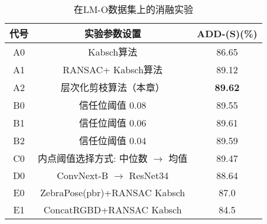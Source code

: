 \begin{table}[htbp]
  \centering
  \caption{在LM-O数据集上的消融实验}
  \label{tab:hipose_ablation_study}
  \begin{tabular}{@{}c|c|c@{}}
    \toprule
    代号 & 实验参数设置 & ADD-(S)(\%) \\
     \midrule
     A0 &Kabsch算法& 86.65 \\
     A1 &RANSAC+ Kabsch算法& 89.12 \\
     A2 &层次化剪枝算法（本章） &\textbf{89.62}\\
     \midrule
     B0 &信任位阈值 0.08& 89.55 \\
     B1 &信任位阈值 0.06& 89.61 \\
     B2 &信任位阈值 0.04& 89.59 \\
     \midrule
     C0 &内点阈值选择方式: 中位数 $\rightarrow$ 均值 & 89.47 \\
     \midrule
     D0 & ConvNext-B\cite{Liu2022ACF} $\rightarrow$ ResNet34\cite{He2015DeepRL} & 88.64 \\
     \midrule
     E0 & ZebraPose(pbr)+RANSAC Kabsch&87.0\\
     E1 & ConcatRGBD+RANSAC Kabsch&84.5\\
    \bottomrule
  \end{tabular}
\end{table}